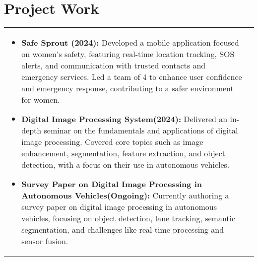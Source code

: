 \documentclass[a4paper,8pt]{article}
\begin{document}
\section{Project Work}
\begin{tabularx}{\linewidth}{ @{}l r@{} }
\begin{minipage}[t]{\linewidth}
    \begin{itemize}[nosep,after=\strut, leftmargin=2em, itemsep=2pt]
        \item \textbf{Safe Sprout (2024):} Developed a mobile application focused on women’s safety, featuring real-time location tracking, SOS alerts, and communication with trusted contacts and emergency services. Led a team of 4 to enhance user confidence and emergency response, contributing to a safer environment for women.
        \item \textbf{Digital Image Processing System(2024):} Delivered an in-depth seminar on the fundamentals and applications of digital image processing. Covered core topics such as image enhancement, segmentation, feature extraction, and object detection, with a focus on their use in autonomous vehicles.
        \item \textbf{Survey Paper on Digital Image Processing in Autonomous Vehicles(Ongoing):} Currently authoring a survey paper on digital image processing in autonomous vehicles, focusing on object detection, lane tracking, semantic segmentation, and challenges like real-time processing and sensor fusion.
    \end{itemize}
    \end{minipage}
\end{tabularx}\\[3pt]

\end{document}
